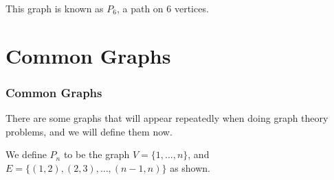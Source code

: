 \documentclass[11pt, mathserif]{beamer}
\theoremstyle{definition}
\theoremstyle{remark}
\begin{document}
\begin{frame}
\begin{example}[Path]
\begin{center}
\begin{tikzpicture}[x=0.75pt,y=0.75pt,yscale=-1,xscale=1]
  
        \end{tikzpicture}
  
    \end{center}
    This graph is known as $P_6$, a path on 6 vertices.
  \end{example}

\end{frame}

\section{Common Graphs}

\begin{frame}
  \frametitle{Common Graphs}

  There are some graphs that will appear repeatedly when doing graph theory problems, and we will define them now.
  

  \vspace*{1.25cm}

  \begin{definition}[Path]
    We define $P_n$ to be the graph 
    $V = \{1, \dots, n\}$, and $E = \{(1, 2), (2, 3), \dots, (n - 1, n)\}$ as shown.
    \begin{center}
      
  
  
        \begin{tikzpicture}[x=0.75pt,y=0.75pt,yscale=-1,xscale=1]
  

\end{tikzpicture}
\end{center}
\end{definition}
\end{frame}
\end{document}
